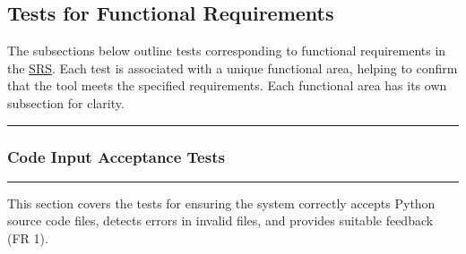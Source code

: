\documentclass[12pt, titlepage]{article}
\newcommand{\SRS}{\href{https://github.com/ssm-lab/capstone--source-code-optimizer/blob/main/docs/SRS/SRS.pdf}{SRS}}
\newcommand{\colorrule}{\textcolor{BlueViolet}{\rule{\linewidth}{2pt}}}
\begin{document}
\subsection{Tests for Functional Requirements}

The subsections below outline tests corresponding to functional 
requirements in the \SRS \cite{SRS}. Each test is associated with a unique functional area, helping to confirm that the tool meets the specified requirements. Each functional area has its own subsection for clarity.

\noindent
\colorrule

\subsubsection{Code Input Acceptance Tests}
\colorrule

\medskip

\noindent
This section covers the tests for ensuring the system correctly accepts Python source code files, detects errors in invalid files, and provides suitable feedback (FR 1).
\end{document}
